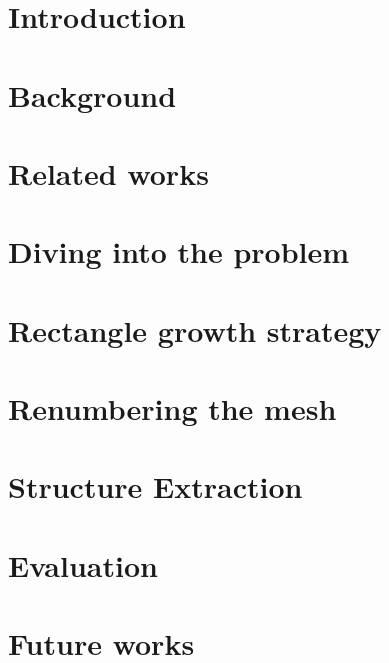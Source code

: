 \documentclass{report}
\begin{document}
\chapter{Introduction}


\chapter{Background}


\chapter{Related works}


\chapter{Diving into the problem}


\chapter{Rectangle growth strategy}


\chapter{Renumbering the mesh}


\chapter{Structure Extraction}


\chapter{Evaluation}


\chapter{Future works}



\nocite{*} %


\end{document}
